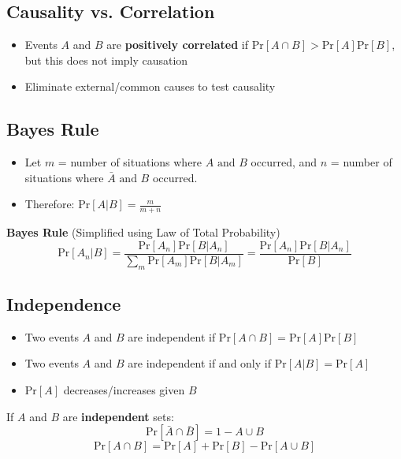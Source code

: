 \documentclass{article}\usepackage{amsmath,amssymb,amsthm,tikz,tkz-graph,color,chngpage,soul,hyperref,csquotes,graphicx,floatrow, listings}\newcommand*{\QEDB}{\hfill\ensuremath{\square}}\newtheorem*{prop}{Proposition}\renewcommand{\theenumi}{\alph{enumi}}\usepackage[shortlabels]{enumitem}\usepackage[nobreak=true]{mdframed}\usetikzlibrary{matrix,calc}\MakeOuterQuote{"}\usepackage[margin=0.75in]{geometry} \newtheorem{theorem}{Theorem}\newcommand{\Z}{\mathbb Z}\newcommand{\R}{\mathbb R}\newcommand{\Q}{\mathbb Q}\newcommand{\N}{\mathbb N}\newcommand{\x}[1]{\textrm{ #1 }}\newcommand{\pr}{\textrm{Pr}}
\begin{document}
\subsection*{Causality vs. Correlation}
\begin{itemize}
    \item Events $A$ and $B$ are \textbf{positively correlated} if $\pr[A\cap B] > \pr[A]\pr[B]$, but this does not imply causation
    \item Eliminate external/common causes to test causality
\end{itemize}
\subsection*{Bayes Rule}
\begin{itemize}
    \item Let $m$ = number of situations where $A \x{and} B$ occurred, and $n$ = number of situations where $\bar{A} \x{and} B$ occurred.
    \item Therefore: $\pr[A|B]=\frac{m}{m+n}$
\end{itemize}
\begin{mdframed}
\textbf{Bayes Rule} (Simplified using Law of Total Probability)
\begin{equation}\pr[A_n|B] =\frac{\pr[A_n]\pr[B|A_n]}{\sum\limits_m\pr[A_m]\pr[B|A_m]}=\frac{\pr[A_n]\pr[B|A_n]}{\pr[B]}\end{equation}
\end{mdframed}
\subsection*{Independence}
\begin{itemize}
    \item Two events $A$ and $B$ are independent if $\pr[A\cap B]=\pr[A]\pr[B]$
    \item Two events $A$ and $B$ are independent if and only if $\pr[A|B]=\pr[A]$
    \item $\pr[A]$ decreases/increases given $B$
\end{itemize}
\begin{mdframed}
If $A$ and $B$ are \textbf{independent} sets:
\begin{equation}\pr[\bar{A}\cap \bar{B}]=1-A\cup B\end{equation}
\begin{equation}\pr[A\cap B]=\pr[A]+\pr[B]-\pr[A\cup B]\end{equation}
\end{mdframed}
\end{document}
